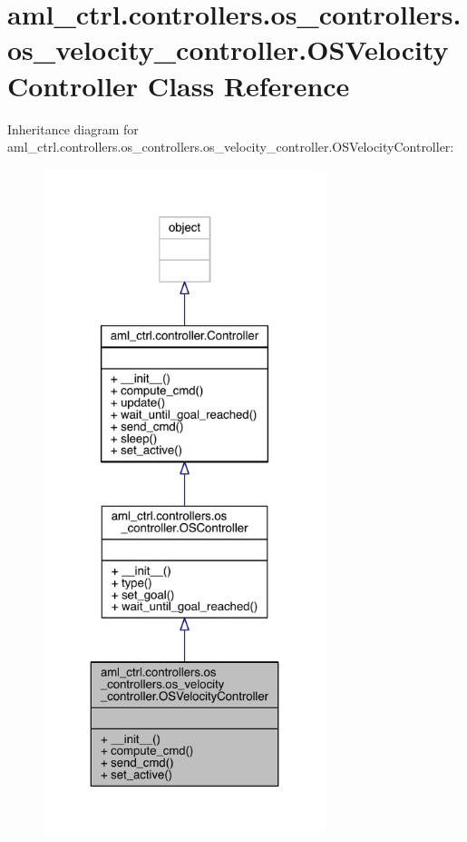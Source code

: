 \hypertarget{classaml__ctrl_1_1controllers_1_1os__controllers_1_1os__velocity__controller_1_1_o_s_velocity_controller}{}\section{aml\+\_\+ctrl.\+controllers.\+os\+\_\+controllers.\+os\+\_\+velocity\+\_\+controller.\+O\+S\+Velocity\+Controller Class Reference}
\label{classaml__ctrl_1_1controllers_1_1os__controllers_1_1os__velocity__controller_1_1_o_s_velocity_controller}


Inheritance diagram for aml\+\_\+ctrl.\+controllers.\+os\+\_\+controllers.\+os\+\_\+velocity\+\_\+controller.\+O\+S\+Velocity\+Controller\+:\nopagebreak
\begin{figure}[H]
\begin{center}
\leavevmode
\includegraphics[height=550pt]{classaml__ctrl_1_1controllers_1_1os__controllers_1_1os__velocity__controller_1_1_o_s_velocity_controller__inherit__graph}
\end{center}
\end{figure}


